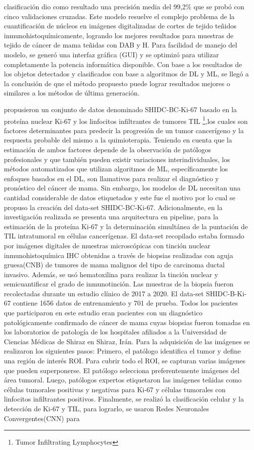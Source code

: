 clasificación dio como resultado una precisión media del 99,2\% que se probó con cinco validaciones cruzadas. Este modelo resuelve el complejo problema de la cuantificación de núcleos en imágenes digitalizadas de cortes de tejido teñidos inmunohistoquímicamente, logrando los mejores resultados para muestras de tejido de cáncer de mama teñidas con DAB y H. Para facilidad de manejo del modelo, se generó una interfaz gráfica (GUI) y se optimizó para utilizar completamente la potencia informática disponible. Con base a los resultados de los objetos detectados y clasificados con base a algoritmos de DL y ML, se llegó a la conclusión de que el método propuesto puede lograr resultados mejores o similares a los métodos de última generación. 

\cite{Negahbani2021} propusieron un conjunto de datos denominado SHIDC-BC-Ki-67 basado en la proteína nuclear Ki-67 y los linfocitos infiltrantes de tumores TIL \footnote{Tumor Infiltrating Lymphocytes},los cuales son factores determinantes para predecir la progresión de un tumor cancerígeno y  la respuesta probable del mismo a la quimioterapia. Teniendo en cuenta que la estimación de ambos factores depende de la observación de patólogos profesionales y que también pueden existir variaciones interindividuales, los métodos automatizados que utilizan algoritmos de ML, específicamente los enfoques basados en el DL, son llamativos para realizar el diagnóstico y pronóstico del cáncer de mama. Sin embargo, los modelos de DL necesitan una cantidad considerable de datos etiquetados y este fue el motivo por lo cual se propuso la creación del data-set SHIDC-BC-Ki-67. Adicionalmente, en la investigación realizada se presenta una arquitectura en pipeline, para la estimación de la proteína Ki-67 y la determinación simultánea de la puntación de TIL intratumoral en células cancerígenas. El data-set recopilado estaba formado por imágenes digitales de muestras microscópicas con tinción nuclear inmunohistoquímica IHC obtenidas a través de biopsias realizadas con aguja gruesa(CNB) de tumores de mama malignos del tipo de carcinoma ductal invasivo. Además, se usó hematoxilina para realizar la tinción nuclear y semicuantificar el grado de inmunotinción. Las muestras de la biopsia fueron recolectadas durante un estudio clínico de 2017 a 2020. El data-set SHIDC-B-Ki-67 contiene 1656 datos de entrenamiento y 701 de prueba. Todos los pacientes que participaron en este estudio eran pacientes con un diagnóstico patológicamente confirmado de cáncer de mama cuyas biopsias fueron tomadas en los laboratorios de patología de los hospitales afiliados a la Universidad de Ciencias Médicas de Shiraz en Shiraz, Irán. Para la adquisición de las imágenes se realizaron los siguientes pasos: Primero, el patólogo identifica el tumor y define una región de interés ROI. Para cubrir todo el ROI, se capturan varias imágenes que pueden superponerse. El patólogo selecciona preferentemente imágenes del área tumoral. Luego, patólogos expertos etiquetaron las imágenes teñidas como células tumorales positivas y negativas para Ki-67 y células tumorales con linfocitos infiltrantes positivos. Finalmente, se realizó la clasificación celular y la detección de Ki-67 y TIL, para lograrlo, se usaron Redes Neuronales Convergentes(CNN) para 